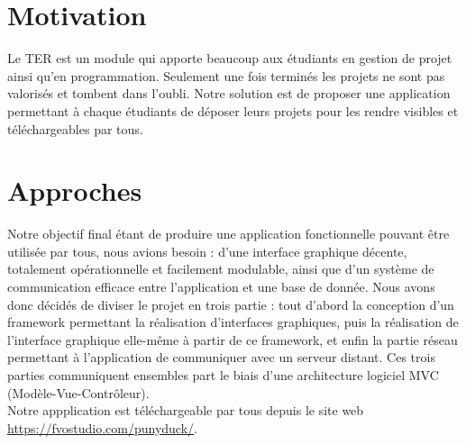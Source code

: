 \documentclass{report}
\begin{document}
\section*{Motivation}

Le TER est un module qui apporte beaucoup aux étudiants en gestion de projet ainsi qu'en programmation. Seulement une fois terminés les projets ne sont pas valorisés et tombent dans l'oubli. Notre solution est de proposer une application permettant à chaque étudiants de déposer leurs projets pour les rendre visibles et téléchargeables par tous.

\section*{Approches}
Notre objectif final étant de produire une application fonctionnelle pouvant être utilisée par tous, nous avions besoin : d'une interface graphique décente, totalement opérationnelle et facilement modulable, ainsi que d'un système de communication efficace entre l'application et une base de donnée. Nous avons donc décidés de diviser le projet en trois partie : tout d'abord la conception d'un framework permettant la réalisation d'interfaces graphiques, puis la réalisation de l'interface graphique elle-même à partir de ce framework, et enfin la partie réseau permettant à l'application de communiquer avec un serveur distant. Ces trois parties communiquent ensembles part le biais d'une architecture logiciel MVC (Modèle-Vue-Contrôleur).\\
Notre appplication est téléchargeable par tous depuis le site web \url{ https://fvostudio.com/punyduck/}.
\end{document}
